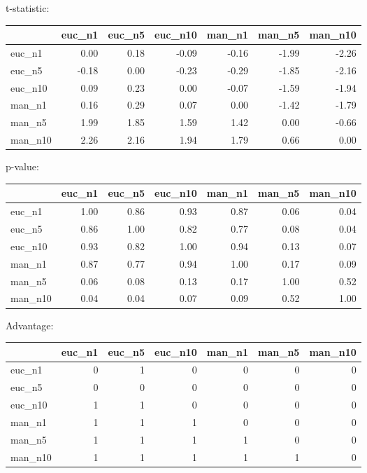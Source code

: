t-statistic:
 \begin{tabular}{lrrrrrr}
\hline
         &   euc\_n1 &   euc\_n5 &   euc\_n10 &   man\_n1 &   man\_n5 &   man\_n10 \\
\hline
 euc\_n1  &     0.00 &     0.18 &     -0.09 &    -0.16 &    -1.99 &     -2.26 \\
 euc\_n5  &    -0.18 &     0.00 &     -0.23 &    -0.29 &    -1.85 &     -2.16 \\
 euc\_n10 &     0.09 &     0.23 &      0.00 &    -0.07 &    -1.59 &     -1.94 \\
 man\_n1  &     0.16 &     0.29 &      0.07 &     0.00 &    -1.42 &     -1.79 \\
 man\_n5  &     1.99 &     1.85 &      1.59 &     1.42 &     0.00 &     -0.66 \\
 man\_n10 &     2.26 &     2.16 &      1.94 &     1.79 &     0.66 &      0.00 \\
\hline
\end{tabular} 

p-value:
 \begin{tabular}{lrrrrrr}
\hline
         &   euc\_n1 &   euc\_n5 &   euc\_n10 &   man\_n1 &   man\_n5 &   man\_n10 \\
\hline
 euc\_n1  &     1.00 &     0.86 &      0.93 &     0.87 &     0.06 &      0.04 \\
 euc\_n5  &     0.86 &     1.00 &      0.82 &     0.77 &     0.08 &      0.04 \\
 euc\_n10 &     0.93 &     0.82 &      1.00 &     0.94 &     0.13 &      0.07 \\
 man\_n1  &     0.87 &     0.77 &      0.94 &     1.00 &     0.17 &      0.09 \\
 man\_n5  &     0.06 &     0.08 &      0.13 &     0.17 &     1.00 &      0.52 \\
 man\_n10 &     0.04 &     0.04 &      0.07 &     0.09 &     0.52 &      1.00 \\
\hline
\end{tabular} 

Advantage:
 \begin{tabular}{lrrrrrr}
\hline
         &   euc\_n1 &   euc\_n5 &   euc\_n10 &   man\_n1 &   man\_n5 &   man\_n10 \\
\hline
 euc\_n1  &        0 &        1 &         0 &        0 &        0 &         0 \\
 euc\_n5  &        0 &        0 &         0 &        0 &        0 &         0 \\
 euc\_n10 &        1 &        1 &         0 &        0 &        0 &         0 \\
 man\_n1  &        1 &        1 &         1 &        0 &        0 &         0 \\
 man\_n5  &        1 &        1 &         1 &        1 &        0 &         0 \\
 man\_n10 &        1 &        1 &         1 &        1 &        1 &         0 \\
\hline
\end{tabular} 

